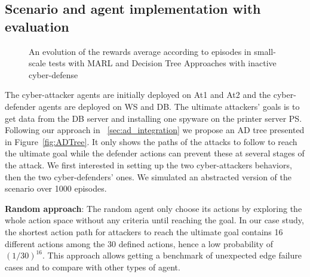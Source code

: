 \documentclass[conference]{IEEEtran}
\begin{document}



\subsection{Scenario and agent implementation with evaluation}

\begin{figure}
    \centering
    
    \caption{An evolution of the rewards average according to episodes in small-scale tests with MARL and Decision Tree Approaches with inactive cyber-defense
    }
    \label{fig:graphs}
\end{figure}

\noindent
The cyber-attacker agents are initially deployed on At1 and At2 and the cyber-defender agents are deployed on WS and DB. The ultimate attackers' goals is to get data from the DB server and installing one spyware on the printer server PS. Following our approach in ~\ref{sec:ad_integration} we propose an AD tree presented in Figure~\ref{fig:ADTree}. It only shows the paths of the attacks to follow to reach the ultimate goal while the defender actions can prevent these at several stages of the attack.
We first interested in setting up the two cyber-attackers behaviors, then the two cyber-defenders' ones. We simulated an abstracted version of the scenario over 1000 episodes.




\noindent
\textbf{Random approach}: \quad The random agent only choose its actions by exploring the whole action space without any criteria until reaching the goal. In our case study, the shortest action path for attackers to reach the ultimate goal contains 16 different actions among the 30 defined actions, hence a low probability of $(1/30)^{16}$.
This approach allows getting a benchmark of unexpected edge failure cases and to compare with other types of agent.
\end{document}
